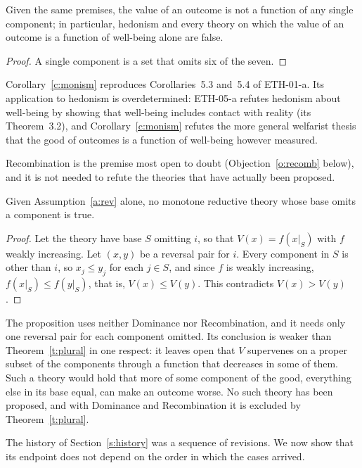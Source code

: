 \documentclass{situationist-preprint}
\begin{document}
\begin{corollary}\label{c:monism}
Given the same premises, the value of an outcome is not a function of any single component; in particular, hedonism and every theory on which the value of an outcome is a function of well-being alone are false.
\end{corollary}

\begin{proof}
A single component is a set that omits six of the seven.
\end{proof}

Corollary~\ref{c:monism} reproduces Corollaries~5.3 and~5.4 of ETH-01-a. Its application to hedonism is overdetermined: ETH-05-a refutes hedonism about well-being by showing that well-being includes contact with reality (its Theorem~3.2), and Corollary~\ref{c:monism} refutes the more general welfarist thesis that the good of outcomes is a function of well-being however measured.

Recombination is the premise most open to doubt (Objection~\ref{o:recomb} below), and it is not needed to refute the theories that have actually been proposed.

\begin{proposition}\label{p:norecomb}
Given Assumption~\ref{a:rev} alone, no monotone reductive theory whose base omits a component is true.
\end{proposition}

\begin{proof}
Let the theory have base $S$ omitting $i$, so that $V(x) = f(x|_S)$ with $f$ weakly increasing. Let $(x, y)$ be a reversal pair for $i$. Every component in $S$ is other than $i$, so $x_j \leq y_j$ for each $j \in S$, and since $f$ is weakly increasing, $f(x|_S) \leq f(y|_S)$, that is, $V(x) \leq V(y)$. This contradicts $V(x) > V(y)$.
\end{proof}

The proposition uses neither Dominance nor Recombination, and it needs only one reversal pair for each component omitted. Its conclusion is weaker than Theorem~\ref{t:plural} in one respect: it leaves open that $V$ supervenes on a proper subset of the components through a function that decreases in some of them. Such a theory would hold that more of some component of the good, everything else in its base equal, can make an outcome worse. No such theory has been proposed, and with Dominance and Recombination it is excluded by Theorem~\ref{t:plural}.

The history of Section~\ref{s:history} was a sequence of revisions. We now show that its endpoint does not depend on the order in which the cases arrived.
\end{document}
